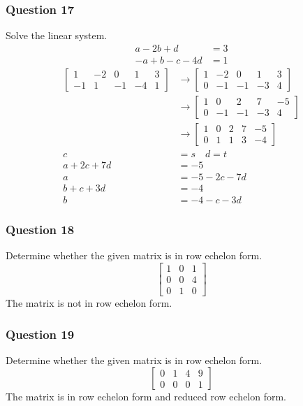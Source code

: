 \documentclass{math}
\begin{document}
\subsubsection*{Question 17}
Solve the linear system.
\begin{align*}
  a-2b+d &= 3 \\
  -a+b-c-4d &= 1
\end{align*}
\begin{align*}
  \begin{bmatrix}
    1 & -2 & 0 & 1 & 3 \\
    -1 & 1 & -1 & -4 & 1
  \end{bmatrix} &\to \begin{bmatrix}
    1 & -2 & 0 & 1 & 3 \\
    0 & -1 & -1 & -3 & 4
  \end{bmatrix} \\
  &\to \begin{bmatrix}
    1 & 0 & 2 & 7 & -5 \\
    0 & -1 & -1 & -3 & 4
  \end{bmatrix} \\
  &\to \begin{bmatrix}
    1 & 0 & 2 & 7 & -5 \\
    0 & 1 & 1 & 3 & -4
  \end{bmatrix} \\
  c &= s \quad d = t \\
  a+2c+7d &= -5 \\
  a &= -5-2c-7d \\
  b+c+3d &= -4 \\
  b &= -4-c-3d
\end{align*}

\subsubsection*{Question 18}
Determine whether the given matrix is in row echelon form.
\[ \begin{bmatrix}
  1 & 0 & 1 \\
  0 & 0 & 4 \\
  0 & 1 & 0
\end{bmatrix} \]
The matrix is not in row echelon form.

\subsubsection*{Question 19}
Determine whether the given matrix is in row echelon form.
\[ \begin{bmatrix}
  0 & 1 & 4 & 9 \\
  0 & 0 & 0 & 1
\end{bmatrix} \]
The matrix is in row echelon form and reduced row echelon form.
\end{document}
